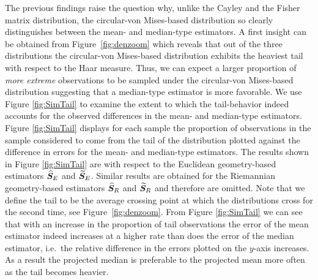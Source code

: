 The previous findings raise the question why, unlike the Cayley and the Fisher matrix distribution, the circular-von Mises-based distribution so clearly distinguishes between the mean- and median-type estimators. A first insight can be obtained from Figure~\ref{fig:denzoom} which reveals that out of the three distributions the circular-von Mises-based distribution exhibits the heaviest tail with respect to the Haar measure. Thus, we can expect a larger proportion of   \textit{more extreme} observations to be sampled under the circular-von Mises-based distribution suggesting that a median-type estimator is more favorable. 
We use Figure \ref{fig:SimTail} to examine the extent to which the tail-behavior indeed accounts for the observed differences in the mean- and median-type estimators. Figure \ref{fig:SimTail} displays for each sample the proportion of observations in the sample considered to come from the tail of the distribution plotted against the difference in errors for the mean- and median-type estimators.  The results shown in Figure \ref{fig:SimTail} are with respect to the Euclidean geometry-based estimators ${\widehat{\bm S}_E}$ and ${\widetilde{\bm S}_E}$. Similar results are obtained for the Riemannian geometry-based estimators ${\widehat{\bm S}_R}$ and ${\widetilde{\bm S}_R}$ and therefore are omitted. Note that we define the tail to be the average crossing point at which the distributions cross for the second time, see Figure~\ref{fig:denzoom}. From  Figure \ref{fig:SimTail} we can see that with an increase in the proportion of tail observations the error of the mean estimator indeed increases at a higher rate than does the error of the median estimator, i.e.~the relative difference in the errors plotted on the $y$-axis increases. As a result the projected median is preferable to the projected mean more often as the tail becomes heavier.  



